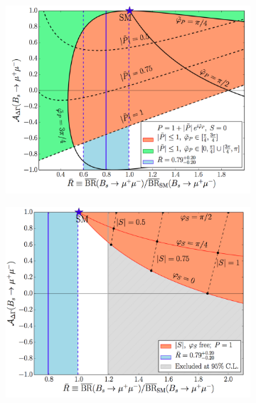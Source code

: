 \begin{figure}
  \centering
  \begin{subfigure}[b]{0.48\textwidth}
  \centering

    \includegraphics[width=\textwidth]{./Figs/Theory/NP_S_0.png}
    \caption{}
    \label{fig:TomJerry}   
  \end{subfigure}             
  \begin{subfigure}[b]{0.48\textwidth}
  \centering

    \includegraphics[width=\textwidth]{./Figs/Theory/NP_P_1.png}
    \caption{}
    \label{fig:WallE}
  \end{subfigure}             
  \begin{subfigure}[b]{0.48\textwidth}
  \centering


\end{subfigure}
\end{figure}
